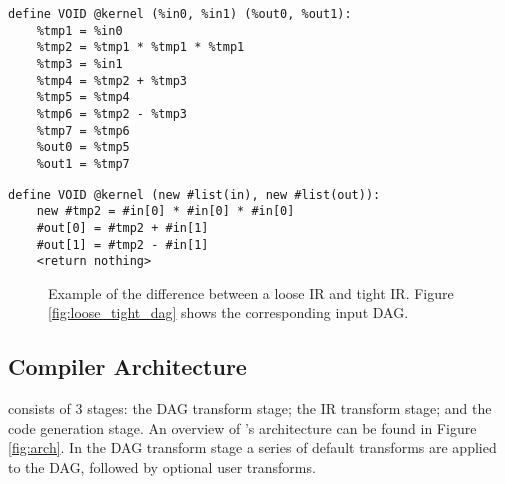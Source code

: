 \newsavebox{\looseIRlisting}
\begin{lrbox}{\looseIRlisting}%
\begin{lstlisting}
define VOID @kernel (%in0, %in1) (%out0, %out1):
	%tmp1 = %in0
	%tmp2 = %tmp1 * %tmp1 * %tmp1
	%tmp3 = %in1
	%tmp4 = %tmp2 + %tmp3
	%tmp5 = %tmp4
	%tmp6 = %tmp2 - %tmp3
	%tmp7 = %tmp6
	%out0 = %tmp5
	%out1 = %tmp7
\end{lstlisting}
\endminipage
\end{lrbox}

\newsavebox{\tightIRlisting}
\begin{lrbox}{\tightIRlisting}%
\begin{lstlisting}
define VOID @kernel (new #list(in), new #list(out)):
	new #tmp2 = #in[0] * #in[0] * #in[0]
	#out[0] = #tmp2 + #in[1]
	#out[1] = #tmp2 - #in[1]
	<return nothing>
\end{lstlisting}
\endminipage
\end{lrbox}

\begin{figure}
\centering


\usebox{\measurebox}\qquad
    \begin{minipage}[][\ht\measurebox][c]{.26\textwidth}
       
    \end{minipage}
\caption{Example of the difference between a loose IR and tight IR. Figure \ref{fig:loose_tight_dag} shows the corresponding input DAG.}
\label{fig:tight_loose}
\end{figure}


\subsection{Compiler Architecture}
\phlat consists of 3 stages: the DAG transform stage; the IR transform stage; and the code generation stage.
An overview of \phlat{}'s architecture can be found in Figure \ref{fig:arch}.
In the DAG transform stage a series of default transforms are applied to the DAG, followed by optional user transforms.

